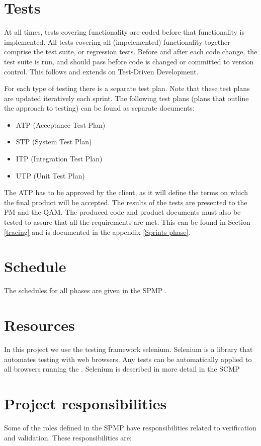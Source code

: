 \section{Tests}
At all times, tests covering functionality are coded before that functionality is implemented. 
All tests covering all (impelemented) functionality together comprise the test suite, or regression tests.
Before and after each code change, the test suite is run, and should pass before code is changed or committed to version control. This follows and extends on Test-Driven Development.

 For each type of testing there is a separate test plan. 
Note that these test plans are updated iteratively each sprint. The following test plans (plans that outline the approach to testing) can be found as separate documents:

\begin{itemize}
\item ATP (Acceptance Test Plan) \cite{atp}
\item STP (System Test Plan) \cite{stp}
\item ITP (Integration Test Plan) \cite{itp}
\item UTP (Unit Test Plan) \cite{utp}
\end{itemize}

The ATP \cite{atp} has to be approved by the client, as it will define the terms on which the final product will be accepted. The results of the tests are presented to the PM and the QAM. The produced code and product documents must also be tested to assure that all the requirements are met. This can be found in Section \ref{tracing} and is documented in the appendix \ref{Sprints phase}.

\section{Schedule}
The schedules for all phases are given in the SPMP \cite{spmp}.

\section{Resources}
In this project we use the testing framework selenium. Selenium is a library that automates testing with web browsers. Any tests can be automatically applied to all browsers running the  \applicationname{}. Selenium is described in more detail in the SCMP\cite{scmp}

\section{Project responsibilities}
    Some of the roles defined in the SPMP have responsibilities related to verification and validation.
    These responsibilities are:\\


